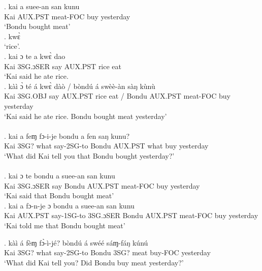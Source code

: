 \documentclass{assets/fieldnotes}
\begin{document}

\exg. kai a suee-an san kunu\\
Kai AUX.PST meat-FOC buy yesterday\\
`Bondu bought meat' \\


\exg. kwɛ̀\\
`rice'.\\

\exg. kai ɔ te a kwɛ̀ dao \\
Kai 3SG.ɔSER say AUX.PST rice eat   \\
`Kai said he ate rice.\\

\exg.  kàì ɔ̀ té á kwɛ̀ dàò / bòndú á swèè-àn sàŋ kùnù\\
Kai 3SG.OBJ say AUX.PST rice eat / Bondu AUX.PST meat-FOC buy yesterday\\
`Kai said he ate rice. Bondu bought meat yesterday'\\

\\

\exg. kai a feɱ fɔ-i-je bondu a fen saŋ kunu?\\
Kai 3SG? what say-2SG-to Bondu AUX.PST what buy yesterday\\
`What did Kai tell you that Bondu bought yesterday?' \\

\\

\exg. kai ɔ te bondu a suee-an san kunu\\
Kai 3SG.ɔSER say Bondu AUX.PST meat-FOC buy yesterday\\
`Kai said that Bondu bought meat' \\

\exg. kai a fɔ-n-je ɔ bondu a suee-an san kunu\\
Kai AUX.PST say-1SG-to 3SG.ɔSER Bondu AUX.PST meat-FOC buy yesterday\\
`Kai told me that Bondu bought meat' \\




\exg. kàì á fèɱ fɔ̀-ì-jé? bòndú á swéé sáɱ-fáŋ kúnú\\
Kai 3SG? what say-2SG-to Bondu 3SG? meat buy-FOC yesterday\\
`What did Kai tell you? Did Bondu buy meat yesterday?' \\
\end{document}
